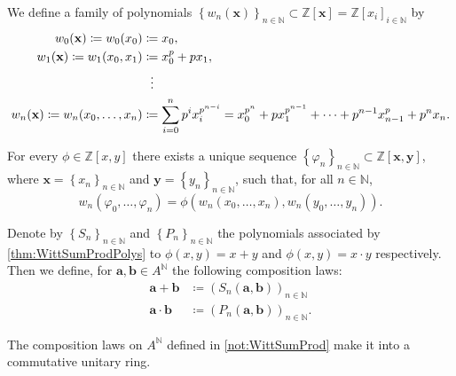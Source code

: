 \begin{defn}
	We define a family of polynomials $\left\{ w_n(\mathbf{x}) \right\}_{n \in \mathbb{N}} \subset
	\mathbb{Z}[\mathbf{x}] = \mathbb{Z}[x_i]_{i \in \mathbb{N}}$ by
	\begin{align*}
		w_0(\mathbf{x}) \coloneqq w_0(x_0) &\coloneqq x_0, \\
		w_1(\mathbf{x}) \coloneqq w_1(x_0, x_1) &\coloneqq x_0^p + px_1, \\
				& \vdotswithin{\coloneqq} \\
		w_n(\mathbf{x}) \coloneqq w_n(x_0, \ldots, x_n) &\coloneqq
		\sum_{ i=0 }^{ n } p^i x_i^{p^{n-i}} =
		x_0^{p^n} + px_1^{p^{n-1}} + \cdots + p^{n-1}x_{n-1}^p + p^n x_n
	.\end{align*}
\end{defn}


\begin{lem}\label{thm:WittSumProdPolys}
	For every $\phi \in \mathbb{Z}[x,y]$ there exists a unique sequence
	$\left\{ \varphi_n \right\}_{n \in \mathbb{N}} \subset \mathbb{Z}[\mathbf{x}, \mathbf{y}]$,
	where $\mathbf{x} = \left\{ x_n \right\}_{n \in \mathbb{N}}$ and
	$\mathbf{y} = \left\{ y_n \right\}_{n \in \mathbb{N}}$, such that,
	for all $n \in \mathbb{N}$,
	\begin{equation*}
		w_n(\varphi_0, \ldots, \varphi_n) =
		\phi \left( w_n(x_0, \ldots, x_n), w_n(y_0, \ldots, y_n) \right)
	.\end{equation*}
\end{lem} 


\begin{ntt}[]\label{not:WittSumProd}
	Denote by $\left\{ S_n \right\}_{n \in \mathbb{N}}$ and
	$\left\{ P_n \right\}_{n \in \mathbb{N}}$ the polynomials associated 
	by \cref{thm:WittSumProdPolys} to 
	$\phi(x,y) = x + y$ and $\phi(x,y) = x \cdot y$ respectively.
	Then we define, for $\mathbf{a},\mathbf{b} \in A^{\mathbb{N}}$ the following
	composition laws:
	\begin{align*}
		\mathbf{a} + \mathbf{b} &\coloneqq
		\left( S_n(\mathbf{a},\mathbf{b}) \right)_{n \in \mathbb{N}}\\
		\mathbf{a} \cdot \mathbf{b} &\coloneqq 
		\left( P_n(\mathbf{a},\mathbf{b}) \right)_{n \in \mathbb{N}}
	.\end{align*}
\end{ntt}


\begin{thm}
	The composition laws on $A^{\mathbb{N}}$ defined in \cref{not:WittSumProd}
	make it into a commutative unitary ring.
\end{thm}



